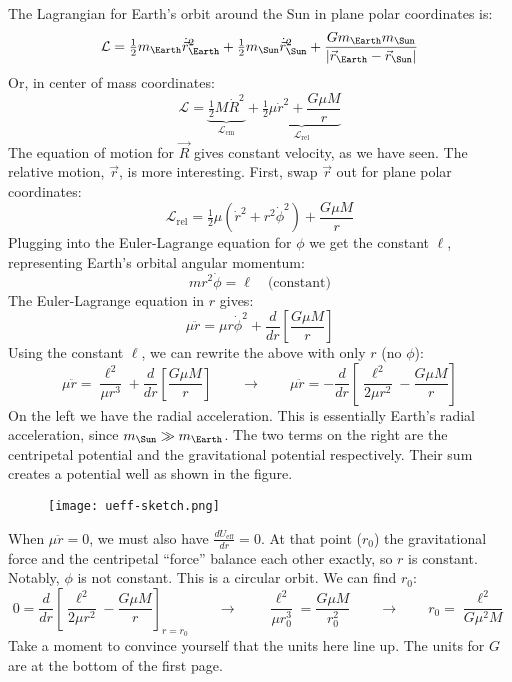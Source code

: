 \documentclass[12pt]{article}
\newcommand{\purple}[1]{{\color{purple} #1}}
\begin{document}
\purple{
The Lagrangian for Earth's orbit around the Sun in plane polar coordinates is:
$$
\mathcal{L} = \tfrac{1}{2} m_\Earth \dot{\vec{r}}^2_\Earth + \tfrac{1}{2} m_\Sun \dot{\vec{r}}^2_\Sun + \frac{G m_\Earth m_\Sun}{| \vec{r}_\Earth - \vec{r}_\Sun |}
$$
Or, in center of mass coordinates:
$$
\mathcal{L} = \underbrace{\tfrac{1}{2} M \dot{R}^2}_{\mathcal{L}_\text{cm}} + \underbrace{\tfrac{1}{2} \mu \dot{r}^2 + \frac{G \mu M}{r}}_{\mathcal{L}_\text{rel}}
$$
The equation of motion for $\vec{R}$ gives constant velocity, as we have seen. The relative motion, $\vec{r}$, is more interesting. First, swap $\vec{r}$ out for plane polar coordinates:
$$
\mathcal{L}_\text{rel} = \tfrac{1}{2} \mu \left( \dot{r}^2 + r^2 \dot{\phi}^2 \right) + \frac{G \mu M}{r}
$$
Plugging into the Euler-Lagrange equation for $\phi$ we get the constant $\ell$, representing Earth's orbital angular momentum:
$$
mr^2\dot{\phi} = \ell \quad \text{(constant)}
$$
The Euler-Lagrange equation in $r$ gives:
$$
\mu \ddot{r} = \mu r \dot{\phi}^2 + \frac{d}{dr} \left[ \frac{G \mu M}{r} \right]
$$
Using the constant $\ell$, we can rewrite the above with only $r$ (no $\phi$):
$$
\mu \ddot{r} = \frac{\ell^2}{\mu r^3} + \frac{d}{dr} \left[ \frac{G \mu M}{r} \right]
\quad\quad\rightarrow\quad\quad
\mu \ddot{r} = -\frac{d}{dr} \left[ \frac{\ell^2}{2 \mu r^2} -\frac{G \mu M}{r} \right]
$$
On the left we have the radial acceleration. This is essentially Earth's radial acceleration, since $m_\Sun \gg m_\Earth$. The two terms on the right are the centripetal potential and the gravitational potential respectively. Their sum creates a potential well as shown in the figure. 

\begin{figure}[h]
\texttt{[image: ueff-sketch.png]}
\centering
\end{figure}

When $\mu \ddot{r}=0$, we must also have $\frac{dU_\text{eff}}{dr}=0$. At that point ($r_0$) the gravitational force and the centripetal ``force'' balance each other exactly, so $r$ is constant. Notably, $\phi$ is not constant. This is a circular orbit. We can find $r_0$:
$$
0 = \frac{d}{dr} \left[ \frac{\ell^2}{2 \mu r^2} -\frac{G \mu M}{r} \right]_{r=r_0}
\quad\quad\rightarrow\quad\quad
\frac{\ell^2}{\mu r_0^3} = \frac{G \mu M}{r_0^2}
\quad\quad\rightarrow\quad\quad
r_0 = \frac{\ell^2}{G \mu^2 M}
$$
Take a moment to convince yourself that the units here line up. The units for $G$ are at the bottom of the first page.

}
\end{document}
